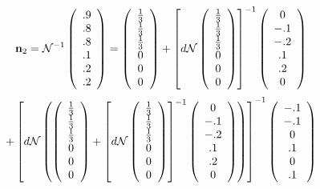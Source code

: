 \documentclass[aps,preprint]{revtex4}%
\begin{document}
\[
\mathbf{n}_{2}=\mathcal{N}^{-1}\left(
\begin{array}
[c]{c}%
.9\\
.8\\
.8\\
.1\\
.2\\
.2
\end{array}
\right)  =\left(
\begin{array}
[c]{c}%
\frac{1}{3}\\
\frac{1}{3}\\
\frac{1}{3}\\
0\\
0\\
0
\end{array}
\right)  +\left[  d\mathcal{N}\left(
\begin{array}
[c]{c}%
\frac{1}{3}\\
\frac{1}{3}\\
\frac{1}{3}\\
0\\
0\\
0
\end{array}
\right)  \right]  ^{-1}\left(
\begin{array}
[c]{c}%
0\\
-.1\\
-.2\\
.1\\
.2\\
0
\end{array}
\right)
\]%
\begin{equation}
+\left[  d\mathcal{N}\left(  \left(
\begin{array}
[c]{c}%
\frac{1}{3}\\
\frac{1}{3}\\
\frac{1}{3}\\
0\\
0\\
0
\end{array}
\right)  +\left[  d\mathcal{N}\left(
\begin{array}
[c]{c}%
\frac{1}{3}\\
\frac{1}{3}\\
\frac{1}{3}\\
0\\
0\\
0
\end{array}
\right)  \right]  ^{-1}\left(
\begin{array}
[c]{c}%
0\\
-.1\\
-.2\\
.1\\
.2\\
0
\end{array}
\right)  \right)  \right]  ^{-1}\left(
\begin{array}
[c]{c}%
-.1\\
-.1\\
0\\
.1\\
0\\
.1
\end{array}
\right)
\end{equation}%
\end{document}
